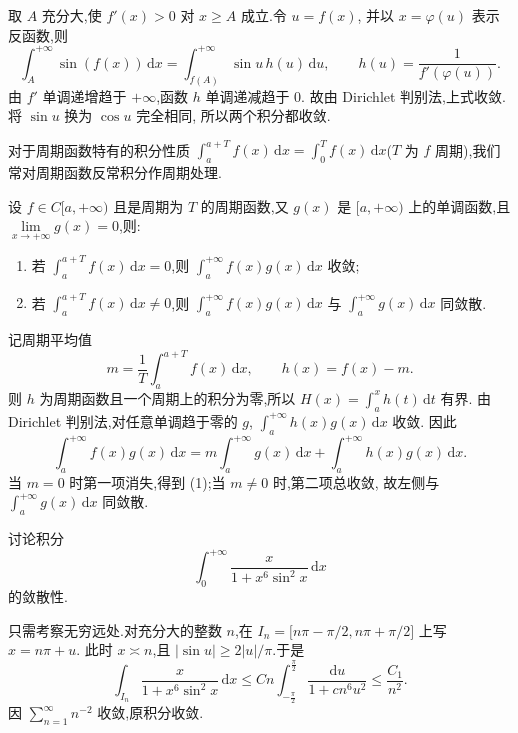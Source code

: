 \begin{solution}
  取 $A$ 充分大,使 $f'(x)>0$ 对 $x\geq A$ 成立.令 $u=f(x)$,
  并以 $x=\varphi(u)$ 表示反函数,则
  \[
    \int_A^{+\infty}\sin(f(x))\,\mathrm{d}x
    =\int_{f(A)}^{+\infty}\sin u\,h(u)\,\mathrm{d}u,
    \qquad
    h(u)=\dfrac{1}{f'(\varphi(u))}.
  \]
  由 $f'$ 单调递增趋于 $+\infty$,函数 $h$ 单调递减趋于 $0$.
  故由 Dirichlet 判别法,上式收敛.将 $\sin u$ 换为 $\cos u$ 完全相同,
  所以两个积分都收敛.
\end{solution}

对于周期函数特有的积分性质 $\displaystyle\int_a^{a+T}f(x)\,\mathrm{d}x=\int_0^Tf(x)\,\mathrm{d}x$($T$ 为 $f$ 周期),我们常对周期函数反常积分作周期处理.

\begin{example}
  设 $f\in C\lbrack a,+\infty)$ 且是周期为 $T$ 的周期函数,又 $g(x)$ 是 $\lbrack a,+\infty)$ 上的单调函数,且 $\displaystyle\lim\limits_{x\to+\infty}g(x)=0$,则:
  \begin{enumerate}
    \item 若 $\displaystyle\int_a^{a+T}f(x)\,\mathrm{d}x=0$,则 $\displaystyle\int_a^{+\infty}f(x)g(x)\,\mathrm{d}x$ 收敛;
    \item 若 $\displaystyle\int_a^{a+T}f(x)\,\mathrm{d}x\neq0$,则 $\displaystyle\int_a^{+\infty}f(x)g(x)\,\mathrm{d}x$ 与 $\displaystyle\int_a^{+\infty}g(x)\,\mathrm{d}x$ 同敛散.
  \end{enumerate}
\end{example}
\exampleblank

\begin{solution}
  记周期平均值
  \[
    m=\dfrac{1}{T}\int_a^{a+T}f(x)\,\mathrm{d}x,
    \qquad
    h(x)=f(x)-m.
  \]
  则 $h$ 为周期函数且一个周期上的积分为零,所以
  $\displaystyle H(x)=\int_a^xh(t)\,\mathrm{d}t$ 有界.
  由 Dirichlet 判别法,对任意单调趋于零的 $g$,
  $\displaystyle\int_a^{+\infty}h(x)g(x)\,\mathrm{d}x$ 收敛.
  因此
  \[
    \int_a^{+\infty}f(x)g(x)\,\mathrm{d}x
    =m\int_a^{+\infty}g(x)\,\mathrm{d}x
    +\int_a^{+\infty}h(x)g(x)\,\mathrm{d}x.
  \]
  当 $m=0$ 时第一项消失,得到 (1);当 $m\neq0$ 时,第二项总收敛,
  故左侧与 $\displaystyle\int_a^{+\infty}g(x)\,\mathrm{d}x$ 同敛散.
\end{solution}

\begin{example}[\markstar]
  讨论积分
  \[
    \int_0^{+\infty}\dfrac{x}{1+x^6\sin^2x}\,\mathrm{d}x
  \]
  的敛散性.
\end{example}
\exampleblank

\begin{solution}
  只需考察无穷远处.对充分大的整数 $n$,在
  $I_n=\lbrack n\pi-\pi/2,n\pi+\pi/2\rbrack$ 上写 $x=n\pi+u$.
  此时 $x\asymp n$,且 $|\sin u|\geq2|u|/\pi$.于是
  \[
    \int_{I_n}\dfrac{x}{1+x^6\sin^2x}\,\mathrm{d}x
    \leq Cn\int_{-\frac{\pi}{2}}^{\frac{\pi}{2}}
    \dfrac{\mathrm{d}u}{1+c n^6u^2}
    \leq\dfrac{C_1}{n^2}.
  \]
  因 $\displaystyle\sum\limits_{n=1}^{\infty}n^{-2}$ 收敛,原积分收敛.
\end{solution}

